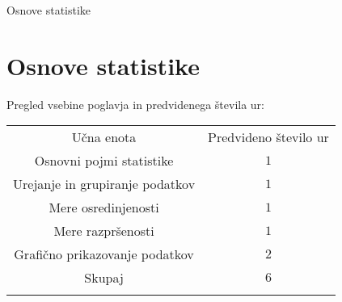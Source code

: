 \begin{priprava}{0}{}{}{Osnove statistike}{}{}

    \chapter{Osnove statistike}

    \Large{Pregled vsebine poglavja in predvidenega števila ur:}

    \begin{table}[H]
        \centering
        \begin{tabular}{||c|c||} 
        \hhline{|t:==:t|}
        \rowcolor[rgb]{0.843,0.718,0.718} 
        Učna enota  & Predvideno število ur   \\ 
        \hhline{|:==:|}
        Osnovni pojmi statistike & $1$    \\ 
        \hline
        Urejanje in grupiranje podatkov & $1$    \\ 
        \hline
        Mere osredinjenosti & $1$    \\ 
        \hline
        Mere razpršenosti & $1$     \\
        \hline
        Grafično prikazovanje podatkov & $2$     \\
        \hhline{|:==:|}
        Skupaj & $6$     \\
        \hhline{|b:==:b|}
        \end{tabular}
    \end{table}


\end{priprava}